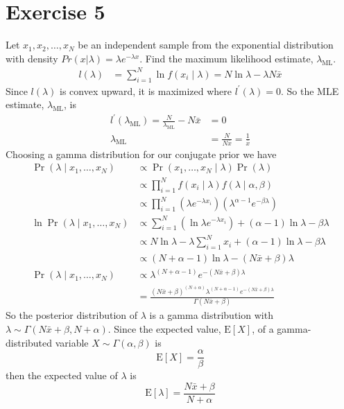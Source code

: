 \documentclass[letterpaper]{amsart}
\begin{document}
\section*{Exercise 5}
Let
\(x_1,x_2,\dots,x_N\)
be an independent sample from the exponential distribution with density
\(
Pr(x|\lambda) = \lambda e^{-\lambda x}
\).
Find the maximum likelihood estimate,
\(\lambda_\text{ML}\).
\begin{align*}
  l(\lambda)
  &= \sum_{i=1}^N\ln f(x_i \mid \lambda)
    = N\ln\lambda - \lambda N\bar{x}
\end{align*}
Since
$l(\lambda)$
is convex upward, it is maximized where
$l^\prime(\lambda) = 0$.
So the MLE estimate,
\(\lambda_{\text{ML}}\),
is
\begin{align*}
  l^\prime
  (\lambda_{\text{ML}})
  = \frac{N}{\lambda_{\text{ML}}} - N\bar{x}
  &=0
    \\
  \lambda_{\text{ML}}
  &= \frac
  {N}
  {N\bar{x}}
  = \frac
  {1}
  {\bar{x}}
\end{align*}
Choosing a gamma distribution for our conjugate prior we have
\begin{align*}
  \Pr(\lambda\mid x_1,\dots, x_N)
  &\propto
    \Pr(x_1,\dots, x_N\mid\lambda)\Pr(\lambda)
    \\
  &\propto
    \prod_{i=1}^Nf(x_i\mid\lambda)f(\lambda\mid\alpha,\beta)
    \\
  &\propto
    \prod_{i=1}^N\left(\lambda e^{-\lambda x_i}\right)
    \left( \lambda^{\alpha-1} e^{-\beta\lambda} \right)
    \\
  \ln\Pr(\lambda\mid x_1,\dots, x_N)
  &\propto
   \sum_{i=1}^N \left( \ln \lambda e^{-\lambda x_i} \right)
    + (\alpha - 1)\ln\lambda-\beta\lambda
    \\
  &\propto
    N\ln\lambda - \lambda \sum_{i=1}^N x_i
    + (\alpha - 1)\ln\lambda-\beta\lambda
    \\
  &\propto
    \left(
    N+\alpha-1
    \right)
    \ln\lambda
    -(N\bar{x} + \beta)\lambda
    \\
  \Pr(\lambda\mid x_1,\dots, x_N)
  &\propto
    \lambda^{
    \left(
    N+\alpha-1
    \right)
    }
    e^{
    -(N\bar{x}+ \beta)\lambda
    }
    \\
  &=
    \frac{
    (N\bar{x}+\beta)^{(N+\alpha)}
    \lambda^{(N+\alpha-1)}
    e^{-(N\bar{x} + \beta)\lambda}
    }
    {
    \Gamma\left(
    N\bar{x}+\beta
    \right)
    }
\end{align*}
So the posterior distribution of \(\lambda\) is a gamma distribution with
\(\lambda\sim\Gamma(N\bar{x}+\beta, N+\alpha)\).
Since the expected value, \(\text{E}\left[X\right]\),
of a gamma-distributed variable \(X\sim\Gamma(\alpha,\beta)\) is
\begin{equation*}
  \text{E}\left[X\right]
  =
  \frac{\alpha}{\beta}
\end{equation*}
then the expected value of \(\lambda\) is
\begin{equation*}
  \text{E}\left[\lambda\right]
  =
  \frac
  {N\bar{x}+\beta}
  {N+\alpha}
\end{equation*}
\end{document}

